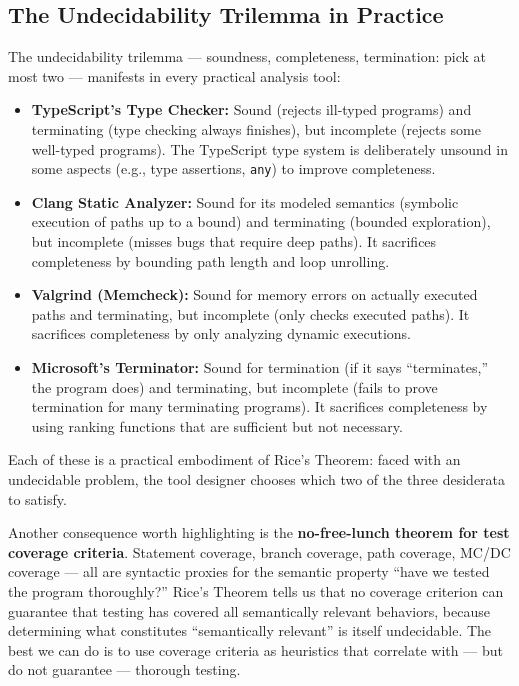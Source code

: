 \subsection*{The Undecidability Trilemma in Practice}

The undecidability trilemma --- soundness, completeness, termination: pick at most two --- manifests in every practical analysis tool:

\begin{itemize}
\item \textbf{TypeScript's Type Checker:} Sound (rejects ill-typed programs) and terminating (type checking always finishes), but incomplete (rejects some well-typed programs). The TypeScript type system is deliberately unsound in some aspects (e.g., type assertions, \texttt{any}) to improve completeness.
\item \textbf{Clang Static Analyzer:} Sound for its modeled semantics (symbolic execution of paths up to a bound) and terminating (bounded exploration), but incomplete (misses bugs that require deep paths). It sacrifices completeness by bounding path length and loop unrolling.
\item \textbf{Valgrind (Memcheck):} Sound for memory errors on actually executed paths and terminating, but incomplete (only checks executed paths). It sacrifices completeness by only analyzing dynamic executions.
\item \textbf{Microsoft's Terminator:} Sound for termination (if it says ``terminates,'' the program does) and terminating, but incomplete (fails to prove termination for many terminating programs). It sacrifices completeness by using ranking functions that are sufficient but not necessary.
\end{itemize}

Each of these is a practical embodiment of Rice's Theorem: faced with an undecidable problem, the tool designer chooses which two of the three desiderata to satisfy.

Another consequence worth highlighting is the \textbf{no-free-lunch theorem for test coverage criteria}. Statement coverage, branch coverage, path coverage, MC/DC coverage --- all are syntactic proxies for the semantic property ``have we tested the program thoroughly?'' Rice's Theorem tells us that no coverage criterion can guarantee that testing has covered all semantically relevant behaviors, because determining what constitutes ``semantically relevant'' is itself undecidable. The best we can do is to use coverage criteria as heuristics that correlate with --- but do not guarantee --- thorough testing.

